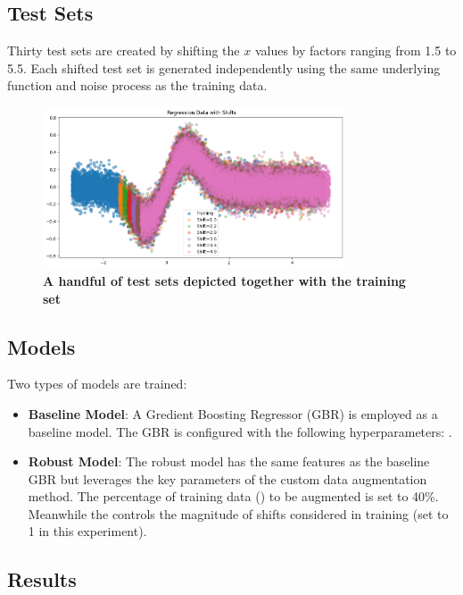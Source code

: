 \subsection{Test Sets}
Thirty test sets are created by shifting the $x$ values by factors ranging from 1.5 to 5.5. Each shifted test set is generated independently using the same underlying function and noise process as the training data.
\begin{figure}[H]
    \centering
    \includegraphics[width=0.8\textwidth]{assets/reg_shift_plot.png} 
    \caption{\textbf{A handful of test sets depicted together with the training set}}
    \label{fig:reg-shift-plot}
\end{figure}

\subsection{Models}
Two types of models are trained:
\begin{itemize}
    \item \textbf{Baseline Model}: A Gredient Boosting Regressor (GBR) is employed as a baseline model. The GBR is configured with the following hyperparameters: .
    \item \textbf{Robust Model}: The robust model has the same features as the baseline GBR but leverages the key parameters of the custom data augmentation method. The percentage of training data () to be augmented is set to 40\%. Meanwhile the  controls the magnitude of shifts considered in training (set to 1 in this experiment).
\end{itemize}

\subsection{Results}

